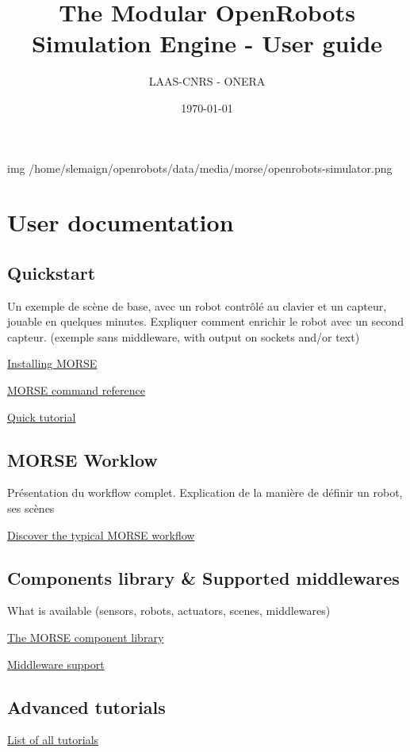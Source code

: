 \documentclass[twoside,a4paper,10pt]{report}
\title{The Modular OpenRobots Simulation Engine - User guide}
\author{LAAS-CNRS - ONERA}
\date{\today}
\newcommand{\dokutitlelevelone}[1]{\chapter{#1}}
\newcommand{\dokutitleleveltwo}[1]{\section{#1}}
\begin{document}
\sffamily
\allsectionsfont{\sffamily}
\thispagestyle{empty}
\maketitle
\thispagestyle{empty}
\cleardoublepage
\tableofcontents
\newpage
\thispagestyle{plain}
\cleardoublepage
\newpage


img /home/slemaign/openrobots/data/media/morse/openrobots-simulator.png



\dokutitlelevelone{User documentation}
\label{8dfab66ae1a0fa03c9f9c3a9dd0dd13e}%
\label{a80da1282f2c775bbc5f2c92c836968b}%

\dokutitleleveltwo{Quickstart}
\label{1f921ae5a6816fd42a8d546be70f22cd}%

Un exemple de scène de base, avec un robot contrôlé au clavier et un capteur, jouable en quelques minutes. Expliquer comment enrichir le robot avec un second capteur. (exemple sans middleware, with output on sockets and/or text)


\hyperref[ea09bb364ef1bffd889e76b7a59035fc]{ Installing MORSE}

\hyperref[60efe788544a384827c39a9803dab85b]{ MORSE command reference}

\hyperref[0575c8d592fb7b088226750aceec2b4e]{ Quick tutorial}


\dokutitleleveltwo{MORSE Worklow}
\label{a345cc68645f5fcc26c477d009dc5e0f}%

Présentation du workflow complet. Explication de la manière de définir un robot, ses scènes

\hyperref[514bac84019bd5e09c0e2b525b09f429]{ Discover the typical MORSE workflow}


\dokutitleleveltwo{Components library \& Supported middlewares}
\label{0c88d1b20b693084703691e13ff5151f}%

What is available (sensors, robots, actuators, scenes, middlewares)

\hyperref[004fdec0cc1a00c19c57e892b7eb1400]{ The MORSE component library}

\hyperref[9a05db9c4b60b0527010fd997682f523]{ Middleware support}


\dokutitleleveltwo{Advanced tutorials}
\label{1db3103f04a8f50e1168ef3c23748f71}%

\hyperref[1db3103f04a8f50e1168ef3c23748f71]{ List of all tutorials}
\end{document}
